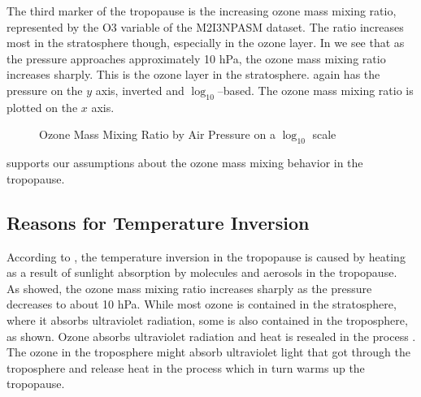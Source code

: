 \documentclass[../00_main.tex]{subfiles}
\begin{document}
The third marker of the tropopause is the increasing ozone mass mixing ratio,
represented by the O3 variable of the M2I3NPASM dataset. The ratio increases
most in the stratosphere though, especially in the ozone layer. In 
 we see that as the pressure approaches approximately 10 hPa, the 
ozone mass mixing ratio increases sharply. This is the ozone layer in the 
stratosphere.  again has the pressure on the $y$ axis, inverted
and $\log_{10}$--based. The ozone mass mixing ratio is plotted on the $x$ axis.
\begin{figure}[H]
\center
    \vspace{-20pt}
    \caption{Ozone Mass Mixing Ratio by Air Pressure on a $\log_{10}$ scale}
    \label{ozone}
\end{figure}
 supports our assumptions about the ozone mass mixing behavior in
the tropopause.

\subsection{Reasons for Temperature Inversion}

According to \cite{inversion}, the temperature inversion in the tropopause is caused by
heating as a result of sunlight absorption by molecules and aerosols in the
tropopause.\\
As  showed, the ozone mass mixing ratio increases sharply as the
pressure decreases to about 10 hPa. While most ozone is contained in the
stratosphere, where it absorbs ultraviolet radiation, some is also contained
in the troposphere, as shown. Ozone absorbs ultraviolet radiation and heat is
resealed in the process \cite{ozone}.
The ozone in the troposphere might absorb ultraviolet light that got through
the troposphere and release heat in the process which in turn warms up the
tropopause.
\end{document}
